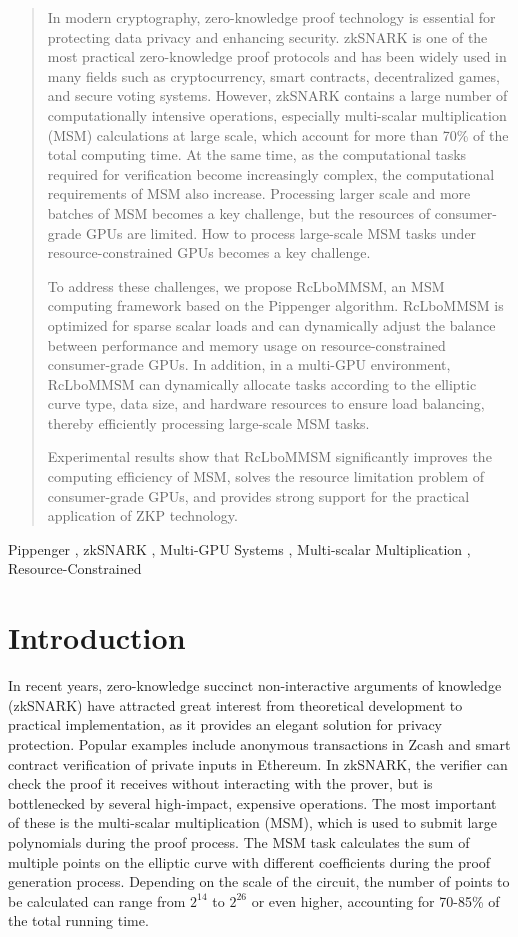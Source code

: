 \documentclass[conference]{IEEEtran}
\begin{document}
\begin{abstract}
In modern cryptography, zero-knowledge proof technology is essential for protecting data privacy and enhancing security. zkSNARK is one of the most practical zero-knowledge proof protocols and has been widely used in many fields such as cryptocurrency, smart contracts, decentralized games, and secure voting systems. However, zkSNARK contains a large number of computationally intensive operations, especially multi-scalar multiplication (MSM) calculations at large scale, which account for more than 70\% of the total computing time. At the same time, as the computational tasks required for verification become increasingly complex, the computational requirements of MSM also increase. Processing larger scale and more batches of MSM becomes a key challenge, but the resources of consumer-grade GPUs are limited. How to process large-scale MSM tasks under resource-constrained GPUs becomes a key challenge.

To address these challenges, we propose RcLboMMSM, an MSM computing framework based on the Pippenger algorithm. RcLboMMSM is optimized for sparse scalar loads and can dynamically adjust the balance between performance and memory usage on resource-constrained consumer-grade GPUs. In addition, in a multi-GPU environment, RcLboMMSM can dynamically allocate tasks according to the elliptic curve type, data size, and hardware resources to ensure load balancing, thereby efficiently processing large-scale MSM tasks. 

Experimental results show that RcLboMMSM significantly improves the computing efficiency of MSM, solves the resource limitation problem of consumer-grade GPUs, and provides strong support for the practical application of ZKP technology.
\end{abstract}

\begin{IEEEkeywords}
Pippenger , zkSNARK , Multi-GPU Systems , Multi-scalar Multiplication , Resource-Constrained
\end{IEEEkeywords}

\section{Introduction}

In recent years, zero-knowledge succinct non-interactive arguments of knowledge (zkSNARK) have attracted great interest from theoretical development to practical implementation, as it provides an elegant solution for privacy protection. Popular examples include anonymous transactions in Zcash and smart contract verification of private inputs in Ethereum. In zkSNARK, the verifier can check the proof it receives without interacting with the prover, but is bottlenecked by several high-impact, expensive operations. The most important of these is the multi-scalar multiplication (MSM), which is used to submit large polynomials during the proof process. The MSM task calculates the sum of multiple points on the elliptic curve with different coefficients during the proof generation process. Depending on the scale of the circuit, the number of points to be calculated can range from $2^{14}$ to $2^{26}$ or even higher, accounting for 70-85\% of the total running time. 
\end{document}
